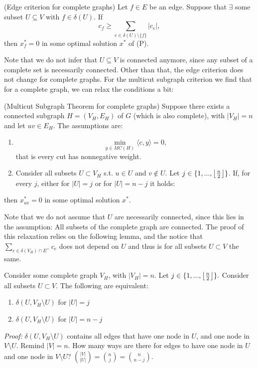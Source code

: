 \begin{theorem}{(Edge criterion for complete graphs)}
Let $f \in E$ be an edge. Suppose that $\exists$ some subset $U \subseteq V$ with $f \in \delta(U)$. If \[ c_f \geq \sum_{e \in \delta(U) \setminus \{f\} } |c_e|, \] then $x^*_f=0$ in some optimal solution $x^*$ of (P).
\end{theorem}
Note that we do not infer that $U \subseteq V$ is connected anymore, since any subset of a complete set is necessarily connected. 
Other than that, the edge criterion does not change for complete graphs. 
For the multicut subgraph criterion we find that for a complete graph, we can relax the conditions a bit:  
\begin{theorem}{(Multicut Subgraph Theorem for complete graphs)}
Suppose there exists a connected subgraph $H=(V_H, E_H)$ of $G$ (which is also complete), with $|V_H|=n$ and let $uv \in E_H$. The assumptions are: 
\begin{enumerate}
    \item \[ \min_{y \in MC(H)} \langle c, y \rangle =0, \] that is every cut has nonnegative weight.
    \item Consider all subsets $U \subset V_H$ s.t. $u \in U$ and $v \notin U$. Let $j \in \{1, ...,  \floor*{\frac{n}{2}} \}$. If, for every $j$, either for $|U|=j$ or for $|U|=n-j$ it holds: %
\end{enumerate}
then $x^*_{uv}=0$ in some optimal solution $x^*$. 
\end{theorem}
Note that we do not assume that $U$ are necessarily connected, since this lies in the assumption: All subsets of the complete graph are connected. The proof of this relaxation relies on the following lemma, and the notice that $\sum_{e \in \delta(V_H) \cap E^+} c_e$ does not depend on $U$ and thus is for all subsets $U \subset V$ the same. 
\begin{lemma}
Consider some complete graph $V_H$, with $|V_H|=n$. Let $j \in \{1, ..., \floor*{\frac{n}{2}}\}.$ Consider all subsets $U \subset V$. The following are equivalent:
\begin{enumerate}
    \item $\delta(U,V_H \setminus U)$ for $|U|=j$
    \item $\delta(U,V_H \setminus U)$ for $|U|=n-j$
\end{enumerate}
\end{lemma}
\textit{Proof:} $\delta(U,V_H \setminus U)$ contains all edges that have one node in $U$, and one node in $V \setminus U$. Remind $|V|=n$. How many ways are there for edges to have one node in $U$ and one node in $V \setminus U$? $\binom{|V|}{|U|}=\binom{n}{j}=\binom{n}{n-j}$. 

